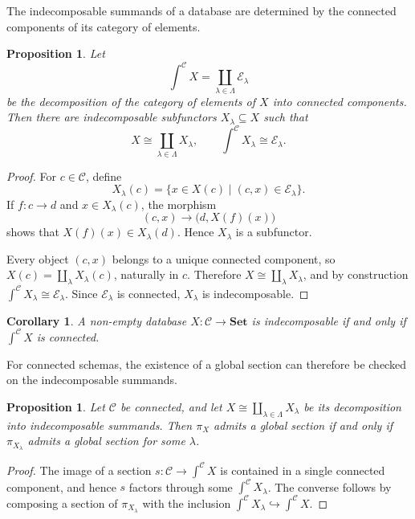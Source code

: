 \documentclass[12pt]{amsart}
\newtheorem{corollary}[teo]{Corollary}
\newtheorem{prop}[teo]{Proposition}
\theoremstyle{definition}
\theoremstyle{remark}
\numberwithin{figure}{section}%
\newcommand{\CC}{\mathcal{C}}
\newcommand{\E}{\mathcal{E}}
\newcommand{\Sets}{\mathbf{Set}}
\begin{document}
The indecomposable summands of a database are determined by the connected
components of its category of elements.

\begin{prop}\label{prop:database_connected_decomposition}
Let
\[
\int^\CC X
=
\coprod_{\lambda\in\Lambda}\E_\lambda
\]
be the decomposition of the category of elements of \(X\) into connected
components. Then there are indecomposable subfunctors
\(X_\lambda\subseteq X\) such that
\[
X\cong\coprod_{\lambda\in\Lambda}X_\lambda,
\qquad
\int^\CC X_\lambda\cong\E_\lambda.
\]
\end{prop}

\begin{proof}
For \(c\in\CC\), define
\[
X_\lambda(c)
=
\{x\in X(c)\mid(c,x)\in\E_\lambda\}.
\]
If \(f\colon c\to d\) and \(x\in X_\lambda(c)\), the morphism
\[
(c,x)\longrightarrow\bigl(d,X(f)(x)\bigr)
\]
shows that \(X(f)(x)\in X_\lambda(d)\). Hence \(X_\lambda\) is a
subfunctor.

Every object \((c,x)\) belongs to a unique connected component, so
\(X(c)=\coprod_\lambda X_\lambda(c)\), naturally in \(c\). Therefore
\(X\cong\coprod_\lambda X_\lambda\), and by construction
\(\int^\CC X_\lambda\cong\E_\lambda\). Since \(\E_\lambda\) is connected,
\(X_\lambda\) is indecomposable.
\end{proof}

\begin{corollary}\label{cor:indecomposable_connected_elements}
A non-empty database \(X\colon\CC\to\Sets\) is indecomposable if and only if
\(\int^\CC X\) is connected.
\end{corollary}

For connected schemas, the existence of a global section can therefore be
checked on the indecomposable summands.

\begin{prop}\label{prop:section_indecomposable_database}
Let \(\CC\) be connected, and let
\(X\cong\coprod_{\lambda\in\Lambda}X_\lambda\) be its decomposition into
indecomposable summands. Then \(\pi_X\) admits a global section if and only
if \(\pi_{X_\lambda}\) admits a global section for some \(\lambda\).
\end{prop}

\begin{proof}
The image of a section
\(s\colon\CC\to\int^\CC X\) is contained in a single connected component,
and hence \(s\) factors through some \(\int^\CC X_\lambda\). The converse
follows by composing a section of \(\pi_{X_\lambda}\) with the inclusion
\(\int^\CC X_\lambda\hookrightarrow\int^\CC X\).
\end{proof}
\end{document}
